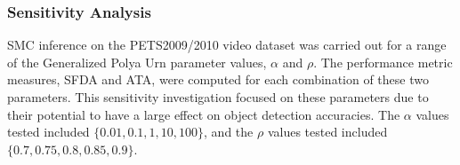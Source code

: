 \documentclass[twocolumn, final]{svjour3}
\begin{document}



\subsubsection{Sensitivity Analysis}
\label{sec:sensitivityanalysis}

SMC inference on the PETS2009/2010 video dataset was carried out for a range of the Generalized Polya Urn parameter values, $\alpha$ and $\rho$. The performance metric measures, SFDA and ATA, were computed for each combination of these two parameters. This sensitivity investigation focused on these parameters due to their potential to have a large effect on object detection accuracies. The $\alpha$ values tested included $\{ 0.01, 0.1, 1, 10, 100 \}$, and the $\rho$ values tested included $\{ 0.7, 0.75, 0.8, 0.85, 0.9 \}$.
\end{document}
